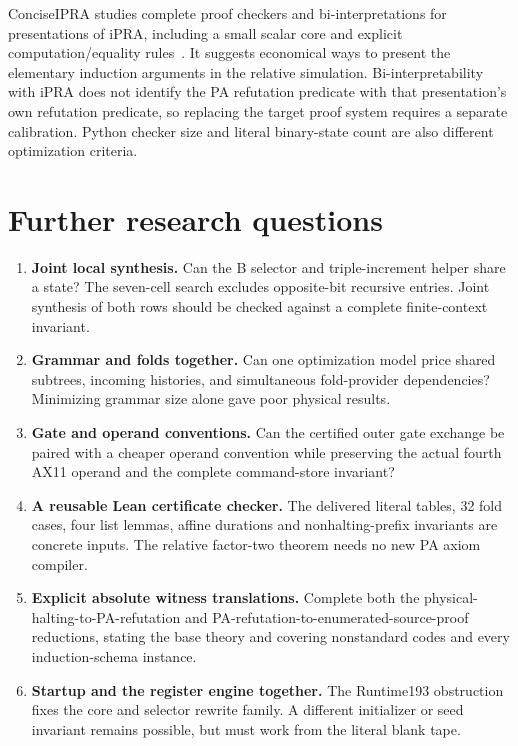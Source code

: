 \documentclass[10pt,letterpaper]{article}
\begin{document}
ConciseIPRA studies complete proof checkers and bi-interpretations for
presentations of iPRA, including a small scalar core and explicit
computation/equality rules~\cite{concise}. It suggests economical ways to
present the elementary induction arguments in the relative simulation.
Bi-interpretability with iPRA does not identify the PA refutation predicate
with that presentation's own refutation predicate, so replacing the target
proof system requires a separate calibration. Python checker size and
literal binary-state count are also different optimization criteria.

\section{Further research questions}
\label{sec:further}

\begin{enumerate}
\item \textbf{Joint local synthesis.} Can the B selector and triple-increment
helper share a state? The seven-cell search excludes opposite-bit recursive
entries. Joint synthesis of both rows should be checked against a complete
finite-context invariant.
\item \textbf{Grammar and folds together.} Can one optimization model price
shared subtrees, incoming histories, and simultaneous fold-provider
dependencies? Minimizing grammar size alone gave poor physical results.
\item \textbf{Gate and operand conventions.} Can the certified outer gate
exchange be paired with a cheaper operand convention while preserving the
actual fourth AX11 operand and the complete command-store invariant?
\item \textbf{A reusable Lean certificate checker.} The delivered literal
tables, 32 fold cases, four list lemmas, affine durations and nonhalting-prefix
invariants are concrete inputs. The relative factor-two theorem needs no new
PA axiom compiler.
\item \textbf{Explicit absolute witness translations.} Complete both the
physical-halting-to-PA-refutation and PA-refutation-to-enumerated-source-proof
reductions, stating the base theory and covering nonstandard codes and every
induction-schema instance.
\item \textbf{Startup and the register engine together.} The Runtime193
obstruction fixes the core and selector rewrite family. A different initializer
or seed invariant remains possible, but must work from the literal blank tape.
\end{enumerate}
\end{document}
